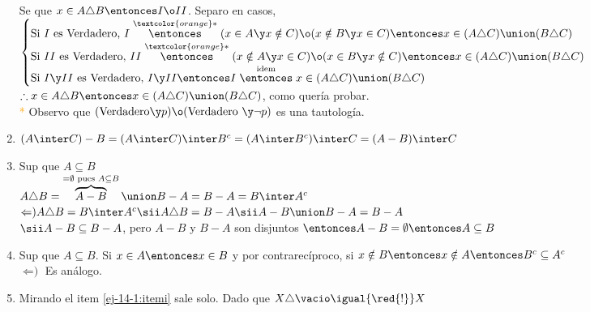 \begin{enumerate}[label=\roman*)]
    Se que $x \in A \triangle B \entonces I \o II$. Separo en casos, \\
    $\begin{cases}
      \text{Si }I\text{ es Verdadero, }I \stackrel{\textcolor{orange}*}{\entonces} (x \in A \y x \notin C) \o (x \notin B \y x \in C) \entonces x \in (A \triangle C) \union (B \triangle C) \\
      \text{Si }II\text{ es Verdadero, }II \stackrel{\textcolor{orange}*}{\entonces} (x \notin A \y x \in C) \o (x \in B \y x \notin C) \entonces x \in (A \triangle C) \union (B \triangle C) \\
      \text{Si }I \y II\text{ es Verdadero, }I \y II \entonces I \stackrel{\text{idem}}{\entonces} x \in (A \triangle C) \union (B \triangle C)
    \end{cases}$ \\
    $\therefore x \in A \triangle B \entonces x \in (A \triangle C) \union (B \triangle C)$, como quería probar. \\
    {\textcolor{orange}*} Observo que $(\text{Verdadero} \y p) \o (\text{Verdadero } \y \neg p)$ es una tautología.

  \item $(A \inter C) - B = (A \inter C) \inter B^c = (A \inter B^c) \inter C = (A-B) \inter C$
  \item  \text{$\Rightarrow$)} Sup que $A \subseteq B$ \\
  $A \triangle B = \overbrace{A - B}^{= \emptyset \text{ pues }A \subseteq B} \union B - A = B - A = B \inter A^c$ \\
  $\text{$\Leftarrow$)}A \triangle B = B \inter A^c \sii A \triangle B = B - A \sii A - B \union B - A = B - A$ \\
  $\sii A - B \subseteq B - A$, pero $A - B$ y $B - A$ son disjuntos $\entonces A - B = \emptyset \entonces A \subseteq B$
  \item \text{$\Rightarrow$)} Sup que $A \subseteq B$. Si $x \in A \entonces x \in B$ y por contrarecíproco, si $x \notin B \entonces x \notin A \entonces B^c \subseteq A^c$ \\
  $\text{$\Leftarrow$)}$ Es análogo.
  \item Mirando el item \ref{ej-14-1:itemi} sale solo. Dado que $X \triangle \vacio \igual{\red{!}} X$
\end{enumerate}
